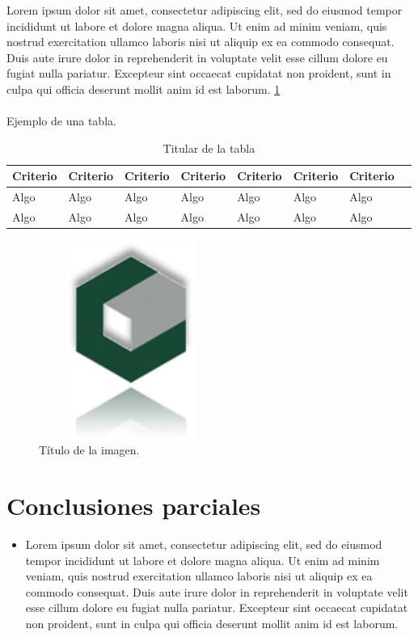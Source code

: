 Lorem ipsum dolor sit amet, consectetur adipiscing elit, sed do eiusmod tempor incididunt ut labore et dolore magna aliqua. Ut enim ad minim veniam, quis nostrud exercitation ullamco laboris nisi ut aliquip ex ea commodo consequat. Duis aute irure dolor in reprehenderit in voluptate velit esse cillum dolore eu fugiat nulla pariatur. Excepteur sint occaecat cupidatat non proident, sunt in culpa qui officia deserunt mollit anim id est laborum. \ref{table:atable}

\paragraph{}Ejemplo de una tabla.

\begin{table}[ht] 
	\centering 
	\begin{tabular}{|p{3cm}|p{1.5cm}|p{1.5cm}|p{1.5cm}|p{1.5cm}|p{3cm}|p{3cm}| p{5cm}|}
		\hline
		\textbf{Criterio} & \textbf{Criterio} & \textbf{Criterio} & \textbf{Criterio} & \textbf{Criterio} & \textbf{Criterio} & \textbf{Criterio} \\ \hline
		Algo & Algo & Algo & Algo & Algo & Algo & Algo \\ \hline
		Algo & Algo & Algo & Algo & Algo & Algo & Algo \\
		\hline
	\end{tabular}
	\caption[Titular de la tabla]{Titular de la tabla}
	\label{table:atable}
\end{table}

\begin{figure}[H]
	\centering
	\includegraphics[width=6cm,height=6.5cm]{Figuras/Logo.png}
	\caption{\sf Título de la imagen.}
	\label{fig:afigure}
\end{figure}

\section{Conclusiones parciales}
\begin{itemize}
	\item Lorem ipsum dolor sit amet, consectetur adipiscing elit, sed do eiusmod tempor incididunt ut labore et dolore magna aliqua. Ut enim ad minim veniam, quis nostrud exercitation ullamco laboris nisi ut aliquip ex ea commodo consequat. Duis aute irure dolor in reprehenderit in voluptate velit esse cillum dolore eu fugiat nulla pariatur. Excepteur sint occaecat cupidatat non proident, sunt in culpa qui officia deserunt mollit anim id est laborum.
\end{itemize}
